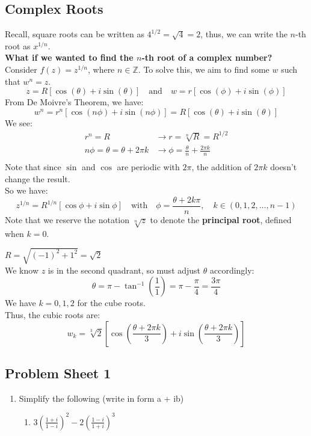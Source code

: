 \documentclass[a4paper, 10pt]{article}
\begin{document}
\subsection{Complex Roots}
Recall, square roots can be written as $4^{1/2} = \sqrt{4} = 2$, thus, we can write the $n$-th root as $x^{1/n}$. \\
\textbf{What if we wanted to find the $n$-th root of a complex number?} \\
Consider $f(z) = z^{1/n}$, where $n\in \mathbb{Z}$. To solve this, we aim to find some $w$ such that $w^n = z$.
$$z = R[\cos(\theta) + i \sin( \theta)] \quad \text{and} \quad w = r[\cos(\phi) + i \sin(\phi)]$$
From De Moivre's Theorem, we have:
$$w^n = r^n[\cos(n\phi) + i\sin(n\phi)] = R[\cos(\theta) + i\sin(\theta)]$$
We see:
\begin{align*}
  r^n = R                          & \rightarrow r = \sqrt[n]{R} = R^{1/2}                  \\
  n\phi = \theta = \theta + 2\pi k & \rightarrow \phi = \frac{\theta}{n} + \frac{2\pi k}{n} \\
\end{align*}
Note that since $\sin$ and $\cos$ are periodic with $2\pi$, the addition of $2\pi k$ doesn't change the result.\\
So we have:
$$z^{1/n} = R^{1/n} [\cos\phi + i \sin\phi] \quad \text{with} \quad \phi = \frac{\theta+ 2k\pi}{n}, \quad k \in (0, 1, 2, \dots, n-1)$$
Note that we reserve the notation $\sqrt[n]{z}$ to denote the \textbf{principal root}, defined when $k = 0$.

\begin{examplebox}[Find the cube roots of $z = -1 + i$]
  $R = \sqrt{(-1)^2 + 1^2} = \sqrt{2}$ \\
  We know $z$ is in the second quadrant, so must adjust $\theta$ accordingly:
  $$\theta = \pi - \tan^{-1}\left(\frac{1}{1}\right) = \pi - \frac{\pi}{4} = \frac{3\pi}{4}$$
  We have $k = 0,1,2$ for the cube roots. \\
  Thus, the cubic roots are:
  $$w_k = \sqrt[3]{2} \left[\cos\left(\frac{\theta + 2\pi k}{3}\right) + i\sin\left(\frac{\theta + 2\pi k}{3}\right)\right]$$
\end{examplebox}

\subsection{Problem Sheet 1}
\begin{enumerate}
  \item Simplify the following (write in form a + ib)
        \begin{enumerate}
          \item $3\left( \frac{1+ i}{1-i} \right)^2 - 2\left(\frac{1-i}{1+i}\right)^3$
        \end{enumerate}
\end{enumerate}
\end{document}
